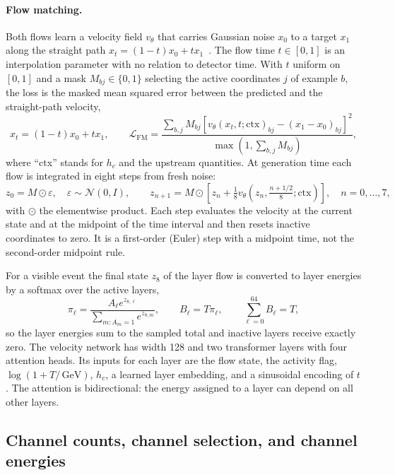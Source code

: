 \documentclass[11pt]{article}
\newcommand{\GeV}{\,\mathrm{GeV}}
\begin{document}
\paragraph{Flow matching.} Both flows learn a velocity field $v_\theta$ that carries Gaussian noise $x_0$ to a target $x_1$ along the straight path $x_t=(1-t)x_0+tx_1$~\cite{flowmatching,rectifiedflow}. The flow time $t\in[0,1]$ is an interpolation parameter with no relation to detector time. With $t$ uniform on $[0,1]$ and a mask $M_{bj}\in\{0,1\}$ selecting the active coordinates $j$ of example $b$, the loss is the masked mean squared error between the predicted and the straight-path velocity,
\begin{equation}
 x_t=(1-t)x_0+t x_1,\qquad
 \mathcal L_{\mathrm{FM}}=
 \frac{\sum_{b,j}M_{bj}
 [v_\theta(x_t,t;\mathrm{ctx})_{bj}-(x_1-x_0)_{bj}]^2}
 {\max(1,\sum_{b,j}M_{bj})},
 \label{eq:cfm}
\end{equation}
where ``ctx'' stands for $h_c$ and the upstream quantities. At generation time each flow is integrated in eight steps from fresh noise:
\begin{equation}
 z_0=M\odot\varepsilon,\quad \varepsilon\sim\mathcal N(0,I),\qquad
 z_{n+1}=M\odot\left[z_n+\tfrac18
 v_\theta\!\left(z_n,\tfrac{n+1/2}{8};\mathrm{ctx}\right)\right],
 \quad n=0,\ldots,7,
 \label{eq:flow_steps}
\end{equation}
with $\odot$ the elementwise product. Each step evaluates the velocity at the current state and at the midpoint of the time interval and then resets inactive coordinates to zero. It is a first-order (Euler) step with a midpoint time, not the second-order midpoint rule.

For a visible event the final state $z_8$ of the layer flow is converted to layer energies by a softmax over the active layers,
\begin{equation}
 \pi_\ell=\frac{A_\ell e^{z_{8,\ell}}}
 {\sum_{m:A_m=1}e^{z_{8,m}}},\qquad
 B_\ell=T\pi_\ell,\qquad \sum_{\ell=0}^{64}B_\ell=T,
 \label{eq:layer_budget}
\end{equation}
so the layer energies sum to the sampled total and inactive layers receive exactly zero. The velocity network has width 128 and two transformer layers with four attention heads. Its inputs for each layer are the flow state, the activity flag, $\log(1+T/\GeV)$, $h_c$, a learned layer embedding, and a sinusoidal encoding of $t$. The attention is bidirectional: the energy assigned to a layer can depend on all other layers.

\subsection{Channel counts, channel selection, and channel energies}
\end{document}
